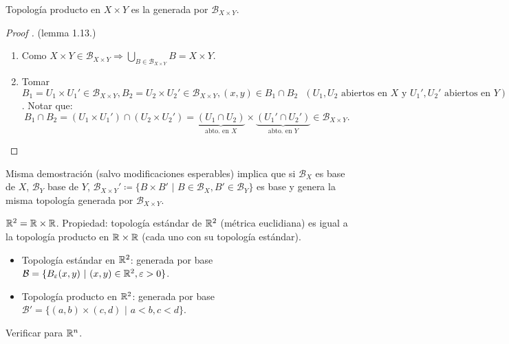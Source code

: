 \documentclass[a4paper]{report}
\begin{document}
	\begin{definition}
		Topología producto en $X \times Y$ es la generada por $\mathcal{B}_{X \times Y}$.
	\end{definition}

	\begin{proof}[Proof ] (lemma 1.13.)
		\begin{enumerate}
			\item Como $X \times Y \in \mathcal{B}_{X \times Y} \Rightarrow \bigcup_{B \in \mathcal{B}_{X \times Y}} B = X \times Y$.

			\item Tomar $B_1 = U_1 \times U_1' \in \mathcal{B}_{X \times Y}, B_2 = U_2 \times U_2' \in \mathcal{B}_{X \times Y}, (x,y) \in B_1 \cap B_2 \text{ } (U_1,U_2 \text{ abiertos en } X \text{ y } U_1',U_2' \text{ abiertos en } Y)$. Notar que:
			\[
			B_1 \cap B_2 = (U_1 \times U_1') \cap (U_2 \times U_2') = \underbrace{(U_1 \cap U_2)}_{\text{abto. en } X} \times \underbrace{(U_1' \cap U_2')}_{\text{abto. en } Y} \in \mathcal{B}_{X \times Y}.
			\]
		\end{enumerate}
	\end{proof}

	\begin{note}
		Misma demostración (salvo modificaciones esperables) implica que si $\mathcal{B}_X$ es base de $X$, $\mathcal{B}_Y$ base de $Y$, $\mathcal{B}_{X \times Y}' \coloneq \{ B \times B' \text{ | } B \in \mathcal{B}_X, B' \in \mathcal{B}_Y \}$ es base y genera la misma topología generada por $\mathcal{B}_{X \times Y}$.  
	\end{note}

	\begin{eg}[importante]
		$\mathbb{R}^2 = \mathbb{R} \times \mathbb{R}$. Propiedad: topología estándar de $\mathbb{R}^2$ (métrica euclidiana) es igual a la topología producto en $\mathbb{R} \times \mathbb{R}$ (cada uno con su topología estándar).
		\begin{itemize}
			\item Topología estándar en $\mathbb{R}^2$: generada por base $\mathcal{B} = \{ B_{\varepsilon} (x,y) \text{ | } (x,y) \in \mathbb{R}^2, \varepsilon > 0 \}$.

			\item Topología producto en $\mathbb{R}^2$: generada por base $\mathcal{B}' = \{ (a,b) \times (c,d) \text{ | } a < b, c < d \}$.  
		\end{itemize}
	\end{eg}

	\begin{ex}
		Verificar para $\mathbb{R}^n$.
	\end{ex}
\end{document}
